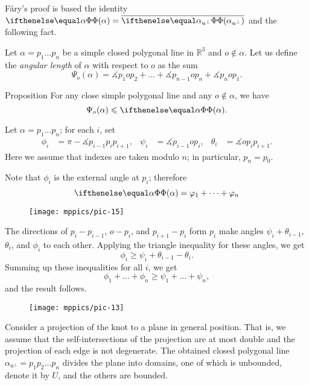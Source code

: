 F\'ary's proof is based the identity $\tc\alpha=\overline{\tc{\alpha_{u^\perp}}}$ and the following fact.

Let $\alpha=p_1\dots p_n$ be a simple closed polygonal line in $\mathbb{R}^3$ and $o\notin\alpha$.
Let us define the \emph{angular length} of $\alpha$ with respect to $o$ as the sum
\[\Psi_o(\alpha)=\measuredangle p_{1} o p_{2}+\dots+\measuredangle p_{n-1} o p_{n}+\measuredangle p_{n} o p_{1}.\]


\begin{thm}{Proposition}\label{prop:angular-length}
For any close simple polygonal line and any $o\notin\alpha$, we have 
\[\Psi_o(\alpha)\le \tc{\alpha}.\]
\end{thm}

Let $\alpha=p_1\dots p_n$; for each $i$, set 
\begin{align*}
\phi_i&=\pi-\measuredangle p_{i-1}p_ip_{i+1},
&
\psi_i&=\measuredangle p_{i-1} o p_{i},
&
\theta_i&=\measuredangle o p_i p_{i+1}.
\end{align*}
Here we assume that indexes are taken modulo $n$; in particular, $p_{n}=p_0$.


Note that $\phi_i$ is the external angle at $p_i$;
therefore 
\[\tc\alpha= \phi_1+\dots+\phi_n\]

\begin{wrapfigure}{r}{20 mm}
\vskip-0mm
\centering
\texttt{[image: mppics/pic-15]}
\vskip0mm
\end{wrapfigure}

The directions of $p_i-p_{i-1}$, $o-p_i$, and $p_{i+1}-p_i$ form $p_i$ make angles 
$\psi_i+\theta_{i-1}$, $\theta_i$, and $\phi_i$ to each other.
Applying the triangle inequality for these angles, we get
\[\phi_i\ge \psi_i+\theta_{i-1}-\theta_i.\]
Summing up these inequalities for all $i$, we get
\[\phi_1+\dots+\phi_n\ge \psi_1+\dots+\psi_n,\]
and the result follows.
\qeds


\begin{wrapfigure}{r}{30 mm}
\vskip-0mm
\centering
\texttt{[image: mppics/pic-13]}
\vskip0mm
\end{wrapfigure}

Consider a projection of the knot to a plane in general position.
That is, we assume that the self-intersections of the projection are at most double and the projection of each edge is not degenerate.
The obtained closed polygonal line $\alpha_{u^\perp}=p_1p_2\dots p_n$ divides the plane into domains, one of which is unbounded, denote it by $U$, and the others are bounded.

